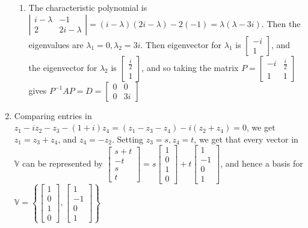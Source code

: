 \documentclass[10pt,english]{article}
\begin{document}
\begin{enumerate}
\begin{enumerate}
    \item The characteristic polynomial is $\left|\begin{matrix}i-\lambda &-1\\2&2i-\lambda\end{matrix}\right|=(i-\lambda)(2i-\lambda)-2(-1)=\lambda(\lambda-3i)$. Then the eigenvalues are $\lambda_1=0,\lambda_2=3i$. Then eigenvector for $\lambda_1$ is $\begin{bmatrix}-i\\1\end{bmatrix}$, and the eigenvector for $\lambda_2$ is $\begin{bmatrix}\frac{i}{2}\\1\end{bmatrix}$, and so taking the matrix $P=\begin{bmatrix}-i&\frac{i}{2}\\1&1\end{bmatrix}$ gives $P^{-1}AP=D=\begin{bmatrix}0&0\\0&3i\end{bmatrix}$
\end{enumerate}

\item Comparing entries in $z_1-iz_2-z_3-(1+i)z_4=(z_1-z_3-z_4)-i(z_2+z_4)=0$, we get $z_1=z_3+z_4$, and $z_4=-z_2$. Setting $z_3=s,z_4=t$, we get that every vector in $\mathbb{V}$ can be represented by $\begin{bmatrix}s+t\\-t\\s\\t\end{bmatrix}=s\begin{bmatrix}1\\0\\1\\0\end{bmatrix}+t\begin{bmatrix}1\\-1\\0\\1\end{bmatrix}$, and hence a basis for $\mathbb{V}=\left\{\begin{bmatrix}1\\0\\1\\0\end{bmatrix},\begin{bmatrix}1\\-1\\0\\1\end{bmatrix}\right\}$ 


\end{enumerate}
\end{document}
